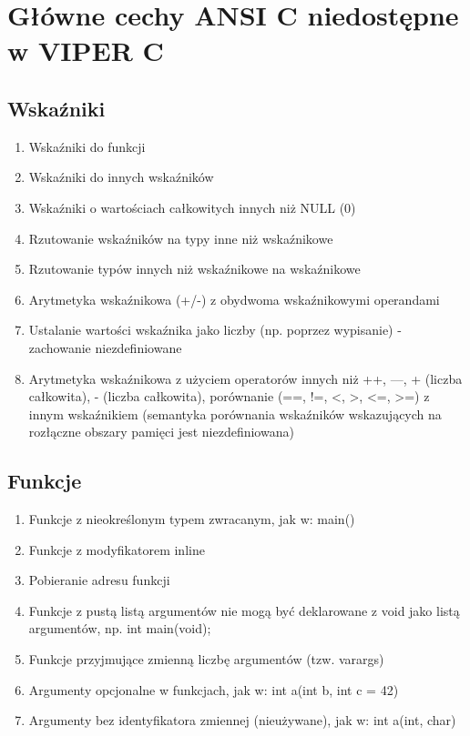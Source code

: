 \documentclass[a4paper,twoside,openright,11pt]{report}
\begin{document}
  \section {Główne cechy ANSI C niedostępne w VIPER C}

  \subsection {Wskaźniki}
    \begin{enumerate}
      \item Wskaźniki do funkcji
      \item Wskaźniki do innych wskaźników
      \item Wskaźniki o wartościach całkowitych innych niż NULL (0)
      \item Rzutowanie wskaźników na typy inne niż wskaźnikowe
      \item Rzutowanie typów innych niż wskaźnikowe na wskaźnikowe
      \item Arytmetyka wskaźnikowa (+/-) z obydwoma wskaźnikowymi operandami
      \item Ustalanie wartości wskaźnika jako liczby (np. poprzez wypisanie) - zachowanie niezdefiniowane
      \item Arytmetyka wskaźnikowa z użyciem operatorów innych niż ++, —, + (liczba całkowita), - (liczba całkowita), porównanie (==, !=, <, >, <=, >=) z innym wskaźnikiem (semantyka porównania wskaźników wskazujących na rozłączne obszary pamięci jest niezdefiniowana)
    \end{enumerate}
  \subsection {Funkcje}
    \begin{enumerate}
      \item Funkcje z nieokreślonym typem zwracanym, jak w: main() { }
      \item Funkcje z modyfikatorem inline
      \item Pobieranie adresu funkcji
      \item Funkcje z pustą listą argumentów nie mogą być deklarowane z void jako listą argumentów, np. int main(void);
      \item Funkcje przyjmujące zmienną liczbę argumentów (tzw. varargs)
      \item Argumenty opcjonalne w funkcjach, jak w: int a(int b, int c = 42) { }
      \item Argumenty bez identyfikatora zmiennej (nieużywane), jak w: int a(int, char) { }
    \end{enumerate}
\end{document}
